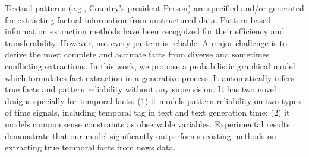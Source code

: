 Textual patterns (e.g., Country's president Person) are specified and/or generated for extracting factual information from unstructured data. Pattern-based information extraction methods have been recognized for their efficiency and transferability. However, not every pattern is reliable: A major challenge is to derive the most complete and accurate facts from diverse and sometimes conflicting extractions. In this work, we propose a probabilistic graphical model which formulates fact extraction in a generative process. It automatically infers true facts and pattern reliability without any supervision. It has two novel designs specially for temporal facts: (1) it models pattern reliability on two types of time signals, including temporal tag in text and text generation time; (2) it models commonsense constraints as observable variables. Experimental results demonstrate that our model significantly outperforms existing methods on extracting true temporal facts from news data.
